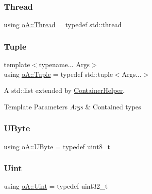 \subsubsection{\texorpdfstring{Thread}{Thread}}
{\footnotesize\ttfamily using \mbox{\hyperlink{namespaceo_a_a38e502e26381eb0b98c9a03430e4dcce}{o\+A\+::\+Thread}} = typedef std\+::thread}

\mbox{\label{namespaceo_a_a9b376768abd013e69cacd776d0356c08}} 
\subsubsection{\texorpdfstring{Tuple}{Tuple}}
{\footnotesize\ttfamily template$<$typename... Args$>$ \\
using \mbox{\hyperlink{namespaceo_a_a9b376768abd013e69cacd776d0356c08}{o\+A\+::\+Tuple}} = typedef std\+::tuple$<$Args...$>$}



A std\+::list extended by \mbox{\hyperlink{classo_a_1_1_container_helper}{Container\+Helper}}. 


\begin{DoxyTemplParams}{Template Parameters}
{\em Args} & Contained types \\
\hline
\end{DoxyTemplParams}
\mbox{\label{namespaceo_a_a8c38e43a304d568b8495770dd8d50513}} 
\subsubsection{\texorpdfstring{U\+Byte}{UByte}}
{\footnotesize\ttfamily using \mbox{\hyperlink{namespaceo_a_a8c38e43a304d568b8495770dd8d50513}{o\+A\+::\+U\+Byte}} = typedef uint8\+\_\+t}

\mbox{\label{namespaceo_a_abe1d8250226c5cf34f84d7b75fc7922e}} 
\subsubsection{\texorpdfstring{Uint}{Uint}}
{\footnotesize\ttfamily using \mbox{\hyperlink{namespaceo_a_abe1d8250226c5cf34f84d7b75fc7922e}{o\+A\+::\+Uint}} = typedef uint32\+\_\+t}

\mbox{\label{namespaceo_a_aeb20ba1e00df0faadde3654ff7d8c4e7}} 
